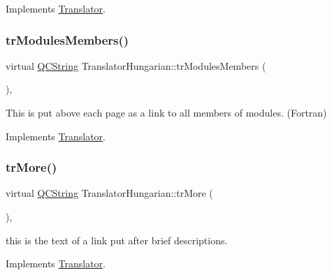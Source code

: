 Implements \mbox{\hyperlink{class_translator}{Translator}}.

\mbox{\label{class_translator_hungarian_a7fcac5e7eb63e63e8250c254c7634f33}} 
\subsubsection{\texorpdfstring{trModulesMembers()}{trModulesMembers()}}
{\footnotesize\ttfamily virtual \mbox{\hyperlink{class_q_c_string}{Q\+C\+String}} Translator\+Hungarian\+::tr\+Modules\+Members (\begin{DoxyParamCaption}{ }\end{DoxyParamCaption})\hspace{0.3cm}{\ttfamily [inline]}, {\ttfamily [virtual]}}

This is put above each page as a link to all members of modules. (Fortran) 

Implements \mbox{\hyperlink{class_translator}{Translator}}.

\mbox{\label{class_translator_hungarian_adb19562aad803e1bbce05e0aec38100e}} 
\subsubsection{\texorpdfstring{trMore()}{trMore()}}
{\footnotesize\ttfamily virtual \mbox{\hyperlink{class_q_c_string}{Q\+C\+String}} Translator\+Hungarian\+::tr\+More (\begin{DoxyParamCaption}{ }\end{DoxyParamCaption})\hspace{0.3cm}{\ttfamily [inline]}, {\ttfamily [virtual]}}

this is the text of a link put after brief descriptions. 

Implements \mbox{\hyperlink{class_translator}{Translator}}.

\mbox{\label{class_translator_hungarian_a5aa63d4b7ecae657721d2172de9bab5a}} 
